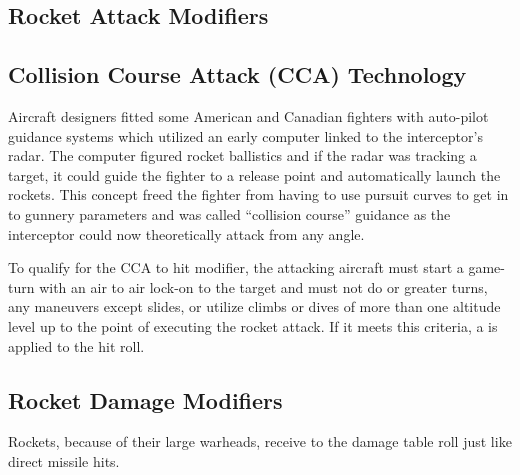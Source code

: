 \begin{advancedrules}
    \subsection{Rocket Attack Modifiers}

    \subsection{Collision Course Attack (CCA) Technology} Aircraft designers fitted some American and Canadian fighters with auto-pilot guidance systems which utilized an early computer linked to the interceptor's radar. The computer figured rocket ballistics and if the radar was tracking a target, it could guide the fighter to a release point and automatically launch the rockets. This concept freed the fighter from having to use pursuit curves to get in to gunnery parameters and was called “collision course” guidance as the interceptor could now theoretically attack from any angle.

    To qualify for the CCA to hit modifier, the attacking aircraft must start a game-turn with an air to air lock-on to the target and must not do  or greater turns, any maneuvers except slides, or utilize climbs or dives of more than one altitude level up to the point of executing the rocket attack. If it meets this criteria, a  is applied to the hit roll.

    \subsection{Rocket Damage Modifiers} Rockets, because of their large warheads, receive  to the damage table roll just like direct missile hits.


\end{advancedrules}
